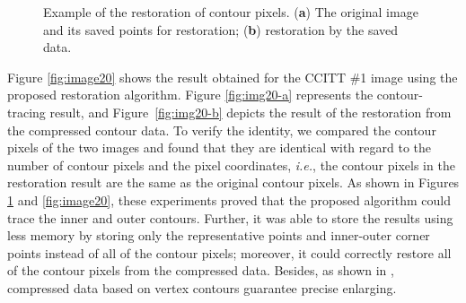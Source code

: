 \documentclass[sensors,article,accept,moreauthors,pdftex,10pt,a4paper]{mdpi}
\begin{document}
\begin{figure}[H]
	\centering
	 
	\caption{Example of the restoration of contour pixels. (\textbf{a}) The original image and its saved points for restoration; (\textbf{b}) restoration by the saved data.}
	\label{fig:image19}
\end{figure}

Figure \ref{fig:image20} shows the result obtained for the CCITT \#1 image using the proposed restoration algorithm. Figure \ref{fig:img20-a} represents the contour-tracing result, and Figure~\ref{fig:img20-b} depicts the result of the restoration from the compressed contour data. To verify the identity, we compared the contour pixels of the two images and found that they are identical with regard to the number of contour pixels and the pixel coordinates, \emph{i.e.}, the contour pixels in the restoration result are the same as the original contour pixels. As shown in Figures \ref{fig:image19} and \ref{fig:image20}, these experiments proved that the proposed algorithm could trace the inner and outer contours. Further, it was able to store the results using less memory by storing only the representative points and inner-outer corner points instead of all of the contour pixels; moreover, it could correctly restore all of the contour pixels from the compressed data. Besides, as shown in \cite{Miyatake1997Contour}, compressed data based on vertex contours guarantee precise enlarging.
\end{document}
